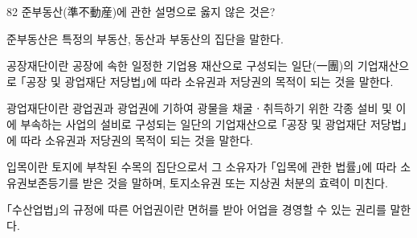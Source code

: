 \begin{question}{82}
준부동산(準不動産)에 관한 설명으로 옳지 않은 것은?
\begin{choices}
  \item 준부동산은 특정의 부동산, 동산과 부동산의 집단을 말한다.
  \item 공장재단이란 공장에 속한 일정한 기업용 재산으로 구성되는 일단(一團)의 기업재산으로 ｢공장 및 광업재단 저당법｣에 따라 소유권과 저당권의 목적이 되는 것을 말한다.
  \item 광업재단이란 광업권과 광업권에 기하여 광물을 채굴ㆍ취득하기 위한 각종 설비 및 이에 부속하는 사업의 설비로 구성되는 일단의 기업재산으로 ｢공장 및 광업재단 저당법｣에 따라 소유권과 저당권의 목적이 되는 것을 말한다.
  \item 입목이란 토지에 부착된 수목의 집단으로서 그 소유자가 ｢입목에 관한 법률｣에 따라 소유권보존등기를 받은 것을 말하며, 토지소유권 또는 지상권 처분의 효력이 미친다.
  \item ｢수산업법｣의 규정에 따른 어업권이란 면허를 받아 어업을 경영할 수 있는 권리를 말한다.
\end{choices}
\end{question}
